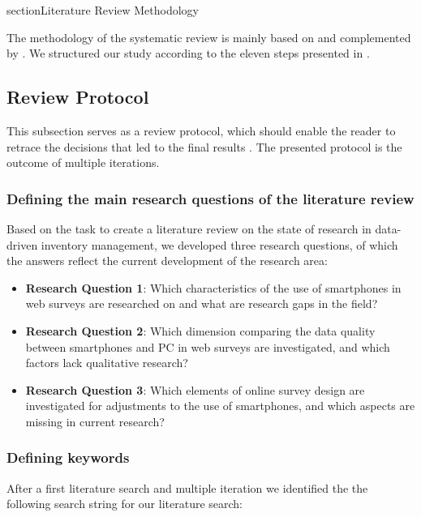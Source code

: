 section{Literature Review Methodology}
\label{sec: methodology}

The methodology of the systematic review is mainly based on \cite{silva_systematic_2016} and complemented by \cite{moher_preferred_2009,thome_conducting_2016,durach_new_2017,snyder_literature_2019}. We structured our study according to the eleven steps presented in \cite{silva_systematic_2016}.

\subsection{Review Protocol}

This subsection serves as a review protocol, which should enable the reader to retrace the decisions that led to the final results \cite{moher_preferred_2009}. The presented protocol is the outcome of multiple iterations.

\subsubsection{Defining the main research questions of the literature review}

Based on the task to create a literature review on the state of research in data-driven inventory management, we developed three research questions, of which the answers reflect the current development of the research area:

\begin{itemize}
   \item \textbf{Research Question 1}: Which characteristics of the use of smartphones in web surveys are researched on and what are research gaps in the field? 
   \item \textbf{Research Question 2}: Which dimension comparing the data quality between smartphones and PC in web surveys are investigated, and which factors lack qualitative research?
   \item \textbf{Research Question 3}: Which elements of online survey design are investigated for adjustments to the use of smartphones, and which aspects are missing in current research?
\end{itemize}

\subsubsection{Defining keywords}
\label{subsubsec: Defining keywords}

After a first literature search and multiple iteration we identified the the following search string for our literature search:

